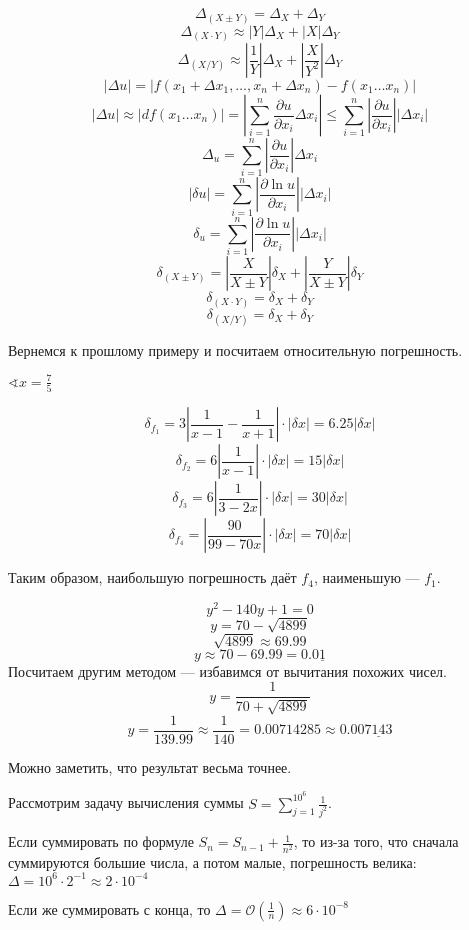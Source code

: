 \documentclass[12pt, a4paper, oneside]{book}
\begin{document}
\[\Delta_{(X \pm Y)} = \Delta_X + \Delta_Y\]
\[\Delta_{(X\cdot Y)} \approx |Y|\Delta_X + |X|\Delta_Y\]
\[\Delta_{(X / Y)} \approx \left|\frac{1}{Y}\right| \Delta_X + \left|\frac{X}{Y^2}\right| \Delta_Y\]
\[|\Delta u| = |f(x_1 + \Delta x_1, \dots , x_n + \Delta x_n) - f(x_1 \dots x_n)|\]
\[|\Delta u| \approx |df(x_1 \dots x_n)| = \left|\sum_{i = 1}^n \frac{\partial u}{\partial x_i} \Delta x_i\right| \leq \sum_{i = 1}^n \left|\frac{\partial u}{\partial x_i}\right| |\Delta x_i|\]
\[\Delta_u = \sum_{i = 1}^n \left|\frac{\partial u}{\partial x_i}\right| \Delta x_i\]
\[|\delta u| = \sum_{i = 1}^n \left|\frac{\partial \ln u}{\partial x_i}\right||\Delta x_i|\]
\[\delta_u = \sum_{i = 1}^n \left|\frac{\partial \ln u}{\partial x_i}\right||\Delta x_i|\]
\[\delta_{(X \pm Y)} = \left|\frac{X}{X \pm Y}\right|\delta_X + \left|\frac{Y}{X \pm Y}\right|\delta_Y\]
\[\delta_{(X\cdot Y)} = \delta_X + \delta_Y\]
\[\delta_{(X / Y)} = \delta_X + \delta_Y\]

Вернемся к прошлому примеру и посчитаем относительную погрешность.

\(\sphericalangle x = \frac{7}{5}\)

\[\delta_{f_1} = 3 \left|\frac{1}{x - 1} - \frac{1}{x + 1}\right| \cdot |\delta x| = 6.25 |\delta x|\]
\[\delta_{f_2} = 6 \left|\frac{1}{x - 1}\right| \cdot |\delta x| = 15 |\delta x|\]
\[\delta_{f_3} = 6 \left|\frac{1}{3 - 2x}\right| \cdot |\delta x| = 30 |\delta x|\]
\[\delta_{f_4} = \left|\frac{90}{99 - 70x}\right| \cdot |\delta x| = 70 |\delta x|\]

Таким образом, наибольшую погрешность даёт \(f_4\), наименьшую --- \(f_1\).

\begin{example}
    \[y^2 - 140y + 1 = 0\]
    \[y = 70 - \sqrt{4899}\]
    \[\sqrt{4899}\approx 69.99\]
    \[y\approx 70 - 69.99 = 0.0\underline 1\]
    Посчитаем другим методом --- избавимся от вычитания похожих чисел.
    \[y = \frac{1}{70 + \sqrt{4899}}\]
    \[y = \frac{1}{139.99}\approx \frac{1}{140} = 0.00714285 \approx 0.00\underline{7143}\]

    Можно заметить, что результат весьма точнее.
\end{example}

\begin{example}
    Рассмотрим задачу вычисления суммы \(S = \sum_{j = 1}^{10^6} \frac{1}{j^2}\).

    Если суммировать по формуле \(S_n = S_{n - 1} + \frac{1}{n^2}\), то из-за того, что сначала суммируются большие числа, а потом малые, погрешность велика: \(\Delta = 10^6 \cdot 2^{ - 1}\approx 2\cdot 10^{ - 4}\)

    Если же суммировать с конца, то \(\Delta = \mathcal{O}\left( \frac{1}{n} \right) \approx 6\cdot 10^{ - 8}\)
\end{example}
\end{document}
